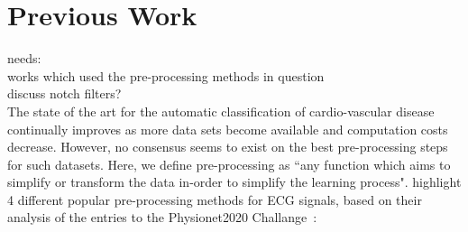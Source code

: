 \documentclass[pmlr,twocolumn]{jmlr}%
\begin{document}
\section{Previous Work}
{\color{red} needs: \\
works which used the pre-processing methods in question\\ discuss notch filters?}\\
\label{sec:prevwork}
The state of the art for the automatic classification of cardio-vascular disease continually improves as more data sets become available and computation costs decrease. However, no consensus seems to exist on the best pre-processing steps for such datasets. Here, we define pre-processing as ``any function which aims to simplify or transform the data in-order to simplify the learning process". \cite{hong2022practical} highlight 4 different popular pre-processing methods for ECG signals, based on their analysis of the entries to the Physionet2020 Challange~\cite{goldberger2000physiobank,alday2020classification}:
\end{document}
